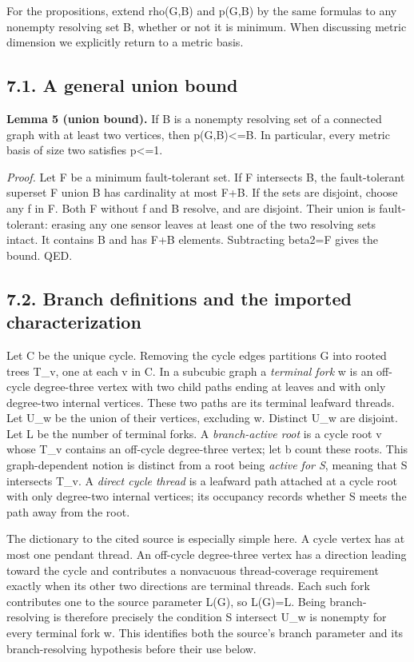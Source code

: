 \documentclass[
]{article}
\newcounter{none} %
\begin{document}
For the propositions, extend rho(G,B) and p(G,B) by the same formulas to
any nonempty resolving set B, whether or not it is minimum. When
discussing metric dimension we explicitly return to a metric basis.

\subsection{7.1. A general union bound}\label{a-general-union-bound}

\textbf{Lemma 5 (union bound).} If B is a nonempty resolving set of a
connected graph with at least two vertices, then
p(G,B)\textless=\textbar B. In particular, every metric basis
of size two satisfies p\textless=1.

\emph{Proof.} Let F be a minimum fault-tolerant set. If F intersects B,
the fault-tolerant superset F union B has cardinality at most
\textbar F\textbar+\textbar B. If the sets are disjoint,
choose any f in F. Both F without f and B resolve, and are disjoint.
Their union is fault-tolerant: erasing any one sensor leaves at least
one of the two resolving sets intact. It contains B and has
\textbar F\textbar+\textbar B elements. Subtracting
beta2=\textbar F\textbar{} gives the bound. QED.

\subsection{7.2. Branch definitions and the imported
characterization}\label{branch-definitions-and-the-imported-characterization}

Let C be the unique cycle. Removing the cycle edges partitions G into
rooted trees T\_v, one at each v in C. In a subcubic graph a
\emph{terminal fork} w is an off-cycle degree-three vertex with two
child paths ending at leaves and with only degree-two internal vertices.
These two paths are its terminal leafward threads. Let U\_w be the union
of their vertices, excluding w. Distinct U\_w are disjoint. Let L be the
number of terminal forks. A \emph{branch-active root} is a cycle root v
whose T\_v contains an off-cycle degree-three vertex; let b count these
roots. This graph-dependent notion is distinct from a root being
\emph{active for S}, meaning that S intersects T\_v. A \emph{direct
cycle thread} is a leafward path attached at a cycle root with only
degree-two internal vertices; its occupancy records whether S meets the
path away from the root.

The dictionary to the cited source is especially simple here. A cycle
vertex has at most one pendant thread. An off-cycle degree-three vertex
has a direction leading toward the cycle and contributes a nonvacuous
thread-coverage requirement exactly when its other two directions are
terminal threads. Each such fork contributes one to the source parameter
L(G), so L(G)=L. Being branch-resolving is therefore precisely the
condition S intersect U\_w is nonempty for every terminal fork w. This
identifies both the source's branch parameter and its branch-resolving
hypothesis before their use below.
\end{document}
